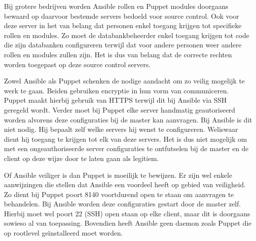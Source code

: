 Bij grotere bedrijven worden Ansible rollen en Puppet modules doorgaans bewaard op daarvoor bestemde servers bedoeld voor source control. Ook voor deze server in het van belang dat personen enkel toegang krijgen tot specifieke rollen en modules. Zo moet de databankbeheerder enkel toegang krijgen tot code die zijn databanken configureren terwijl dat voor andere personen weer andere rollen en modules zullen zijn. Het is dus van belang dat de correcte rechten worden toegepast op deze source control servers.

Zowel Ansible als Puppet schenken de nodige aandacht om zo veilig mogelijk te werk te gaan. Beiden gebruiken encryptie in hun vorm van communiceren. Puppet maakt hierbij gebruik van HTTPS terwijl dit bij Ansible via SSH geregeld wordt. Verder moet bij Puppet elke server handmatig geautoriseerd worden alvorens deze configuraties bij de master kan aanvragen. Bij Ansible is dit niet nodig. Hij bepaalt zelf welke servers hij wenst te configureren. Weliswaar dient hij toegang te krijgen tot elk van deze servers. Het is dus niet mogelijk om met een ongeauthoriseerde server configuraties te ontfutselen bij de master en de client op deze wijze door te laten gaan als legitiem. 

Of Ansible veiliger is dan Puppet is moeilijk te bewijzen. Er zijn wel enkele aanwijzingen die stellen dat Ansible een voordeel heeft op gebied van veiligheid. Zo dient bij Puppet poort 8140 voortdurend open te staan om aanvragen te behandelen. Bij Ansible worden deze configuraties gestart door de master zelf. Hierbij moet wel poort 22 (SSH) open staan op elke client, maar dit is doorgaans sowieso al van toepassing. Bovendien heeft Ansible geen daemon zoals Puppet die op rootlevel geïnstalleerd moet worden.



